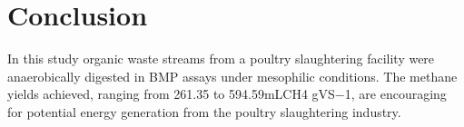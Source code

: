 \section{Conclusion}
In this study organic waste streams from a poultry slaughtering facility were anaerobically digested in BMP assays under mesophilic conditions. The methane yields achieved, ranging from 261.35 to 594.59mLCH4 gVS−1, are encouraging for potential energy generation from the poultry slaughtering industry.